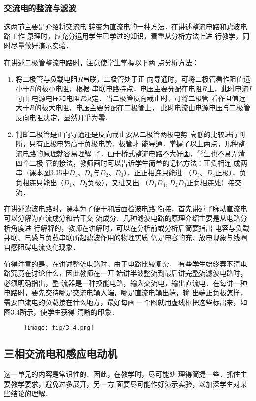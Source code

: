 \subsubsection{交流电的整流与滤波}

这两节主要是介绍将交流电
转变为直流电的一种方法．在讲述整流电路和滤波电路工作
原理时，应充分运用学生已学过的知识，着重从分析方法上进
行教学，同时尽量做好演示实验．

在讲述二极管整流电路时，注意使学生掌握以下两
点分析方法：
\begin{enumerate}
\item 将二极管与负载电阻$R$串联，二极管处于正
向导通时，可将二极管看作阻值远小于$R$的极小电阻，根据
串联电路特点，电压主要分配在电阻$R$上，此时电流$I$可由
电源电压和电阻$R$决定．当二极管反向截止时，可将二极管
看作阻值远大于$R$的极大电阻，电压主要分配在二极管上，
此时电流由电源电压与二极管反向电阻决定，显然几乎为零．
\item 判断二极管是正向导通还是反向截止要从二极管两极电势
高低的比较进行判断，只有正极电势高于负极电势，极管才
能导通．掌握了以上两点，几种整流电路的原理就容易理解
了．由于桥式整流电路不大好画，学生也不易弄清四个二极
管的接法，教师画时可以告诉学生简单的记忆方法：正负相连
成两串（课本图3.35中$D_1$、$D_4$与$D_2$、$D_3$），正正相连只能进
（$D_3$、$D_4$正极），负负相连只能出（$D_1$、$D_2$负极），又进又出
（$D_1D_4$, $D_2D_3$正负相连处）接交流．
\end{enumerate}


在讲述滤波电路时，课本为了便于和后面检波电路
衔接，首先讲述了脉动直流电可以分解为直流成分和若干交
流成分．几种滤波电路的原理介绍主要是从电路分析角度进
行解释的，教师在讲解时，可以在分析前或分析后简要指出
电容与负载并联、电感与负载串联所起滤波作用的物理实质
仍是电容的充、放电现象与线圈自感阻碍电流变化现象．

值得注意的是，在讲述整流电路时，由于电路比较复杂，
有些学生始终弄不清电路究竟在讨论什么，因此教师在一开
始讲半波整流到最后讲完整流滤波电路时，必须明确指出，整
流器是一种换能电路，输入交流电，输出直流电．在每讲一种
电路时，要先交待哪是交流电输入端，哪是直流电输出端，输
出端正负极怎样，需要直流电的负载接在什么地方，最好每画
一个图就用虚线框把这些标出来，如图3.4所示，使学生获得
清晰的印象．
\begin{figure}[htp]
    \centering
\texttt{[image: fig/3-4.png]}
    \caption{}
\end{figure}

\subsection{三相交流电和感应电动机}
这一单元的内容是常识性的．因此，在教学时，尽可能处
理得简捷一些．抓住主要教学要求，避免过多展开，另一方
面要尽可能作好演示实验，以加深学生对某些结论的理解．

